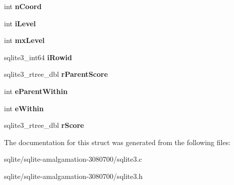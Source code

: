 \begin{DoxyCompactItemize}
\item 
\hypertarget{structsqlite3__rtree__query__info_aa4b95a36fe7306e17e8cf9329fcb0964}{int {\bfseries n\+Coord}}\label{structsqlite3__rtree__query__info_aa4b95a36fe7306e17e8cf9329fcb0964}

\item 
\hypertarget{structsqlite3__rtree__query__info_af91ca2d5f867b3b0aa9c91920a3b5b45}{int {\bfseries i\+Level}}\label{structsqlite3__rtree__query__info_af91ca2d5f867b3b0aa9c91920a3b5b45}

\item 
\hypertarget{structsqlite3__rtree__query__info_ac84533734fb4c86c3f2deba904118785}{int {\bfseries mx\+Level}}\label{structsqlite3__rtree__query__info_ac84533734fb4c86c3f2deba904118785}

\item 
\hypertarget{structsqlite3__rtree__query__info_a9e43489993c8aeace851f86eaa00ec26}{sqlite3\+\_\+int64 {\bfseries i\+Rowid}}\label{structsqlite3__rtree__query__info_a9e43489993c8aeace851f86eaa00ec26}

\item 
\hypertarget{structsqlite3__rtree__query__info_af7da93e7fc405eec7e7ec90ab237eab2}{sqlite3\+\_\+rtree\+\_\+dbl {\bfseries r\+Parent\+Score}}\label{structsqlite3__rtree__query__info_af7da93e7fc405eec7e7ec90ab237eab2}

\item 
\hypertarget{structsqlite3__rtree__query__info_a8bd37c6af5427c35830f674a4db682c3}{int {\bfseries e\+Parent\+Within}}\label{structsqlite3__rtree__query__info_a8bd37c6af5427c35830f674a4db682c3}

\item 
\hypertarget{structsqlite3__rtree__query__info_ad1038309f7ea55472a7ff99bf4f9d514}{int {\bfseries e\+Within}}\label{structsqlite3__rtree__query__info_ad1038309f7ea55472a7ff99bf4f9d514}

\item 
\hypertarget{structsqlite3__rtree__query__info_af449e4a3607573d17b3d31c67b6e1584}{sqlite3\+\_\+rtree\+\_\+dbl {\bfseries r\+Score}}\label{structsqlite3__rtree__query__info_af449e4a3607573d17b3d31c67b6e1584}

\end{DoxyCompactItemize}


The documentation for this struct was generated from the following files\+:\begin{DoxyCompactItemize}
\item 
sqlite/sqlite-\/amalgamation-\/3080700/sqlite3.\+c\item 
sqlite/sqlite-\/amalgamation-\/3080700/sqlite3.\+h\end{DoxyCompactItemize}

